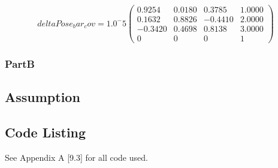 		$$
		deltaPose_bar_cov = 1.0^-5
		\begin{pmatrix}
		0.9254 & 0.0180 & 0.3785 & 1.0000\\
		0.1632 & 0.8826 & -0.4410 & 2.0000\\
		-0.3420  & 0.4698  & 0.8138 & 3.0000\\
		0 & 0 & 0 & 1
		\end{pmatrix}
		$$
		
			
		\subsubsection{PartB}
		
		

		
	\pagebreak
	\subsection*{Assumption}

	\subsection*{Code Listing}
	See Appendix A [9.3] for all code used.
